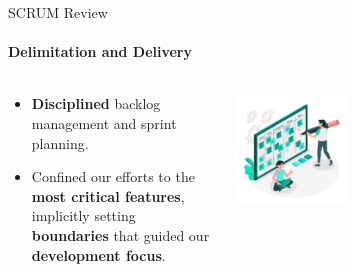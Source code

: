 \documentclass[
ngerman,%
authorontitle=true,
]{bfhbeamer}
\begin{document}
	\begin{frame}{SCRUM Review}
		\framesubtitle{Delimitation and Delivery}
		\begin{columns} %
			\begin{column}{0.6\textwidth} %
				\begin{itemize}
					\item \textbf{Disciplined} backlog management and sprint planning.
					\item Confined our efforts to the \textbf{most critical features}, implicitly setting \textbf{boundaries} that guided our \textbf{development focus}.
				\end{itemize}
			\end{column}
			\begin{column}{0.4\textwidth} %
				\includegraphics[width=0.4\textwidth]{pictures/final_presentation/scrum board concept illustration}
			\end{column}
		\end{columns} %
	\end{frame}
	
\end{document}
